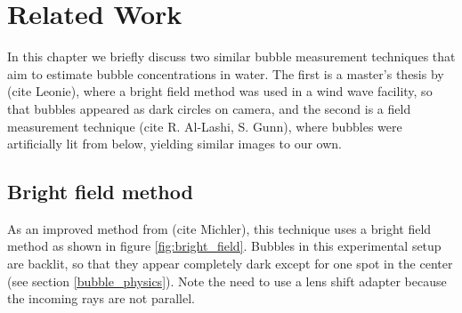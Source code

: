 \chapter{Related Work} \label{related_work}
 

In this chapter we briefly discuss two similar bubble measurement techniques that aim to estimate bubble concentrations in water. The first is a master's thesis by (cite Leonie), where a bright field method was used in a wind wave facility, so that bubbles appeared as dark circles on camera, and the second is a field measurement technique (cite R. Al-Lashi, S. Gunn), where bubbles were artificially lit from below, yielding similar images to our own. 

\section{Bright field method}
	As an improved method from (cite Michler), this technique uses a bright field method as shown in figure \ref{fig:bright_field}. Bubbles in this experimental setup are backlit, so that they appear completely dark except for one spot in the center (see section  \ref{bubble_physics}). Note the need to use a lens shift adapter because the incoming rays are not parallel. 
	
